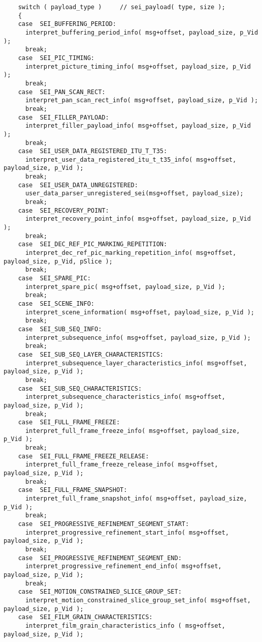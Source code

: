 \begin{lstlisting}
    switch ( payload_type )     // sei_payload( type, size );
    {
    case  SEI_BUFFERING_PERIOD:
      interpret_buffering_period_info( msg+offset, payload_size, p_Vid );
      break;
    case  SEI_PIC_TIMING:
      interpret_picture_timing_info( msg+offset, payload_size, p_Vid );
      break;
    case  SEI_PAN_SCAN_RECT:
      interpret_pan_scan_rect_info( msg+offset, payload_size, p_Vid );
      break;
    case  SEI_FILLER_PAYLOAD:
      interpret_filler_payload_info( msg+offset, payload_size, p_Vid );
      break;
    case  SEI_USER_DATA_REGISTERED_ITU_T_T35:
      interpret_user_data_registered_itu_t_t35_info( msg+offset, payload_size, p_Vid );
      break;
    case  SEI_USER_DATA_UNREGISTERED:
      user_data_parser_unregistered_sei(msg+offset, payload_size);
      break;
    case  SEI_RECOVERY_POINT:
      interpret_recovery_point_info( msg+offset, payload_size, p_Vid );
      break;
    case  SEI_DEC_REF_PIC_MARKING_REPETITION:
      interpret_dec_ref_pic_marking_repetition_info( msg+offset, payload_size, p_Vid, pSlice );
      break;
    case  SEI_SPARE_PIC:
      interpret_spare_pic( msg+offset, payload_size, p_Vid );
      break;
    case  SEI_SCENE_INFO:
      interpret_scene_information( msg+offset, payload_size, p_Vid );
      break;
    case  SEI_SUB_SEQ_INFO:
      interpret_subsequence_info( msg+offset, payload_size, p_Vid );
      break;
    case  SEI_SUB_SEQ_LAYER_CHARACTERISTICS:
      interpret_subsequence_layer_characteristics_info( msg+offset, payload_size, p_Vid );
      break;
    case  SEI_SUB_SEQ_CHARACTERISTICS:
      interpret_subsequence_characteristics_info( msg+offset, payload_size, p_Vid );
      break;
    case  SEI_FULL_FRAME_FREEZE:
      interpret_full_frame_freeze_info( msg+offset, payload_size, p_Vid );
      break;
    case  SEI_FULL_FRAME_FREEZE_RELEASE:
      interpret_full_frame_freeze_release_info( msg+offset, payload_size, p_Vid );
      break;
    case  SEI_FULL_FRAME_SNAPSHOT:
      interpret_full_frame_snapshot_info( msg+offset, payload_size, p_Vid );
      break;
    case  SEI_PROGRESSIVE_REFINEMENT_SEGMENT_START:
      interpret_progressive_refinement_start_info( msg+offset, payload_size, p_Vid );
      break;
    case  SEI_PROGRESSIVE_REFINEMENT_SEGMENT_END:
      interpret_progressive_refinement_end_info( msg+offset, payload_size, p_Vid );
      break;
    case  SEI_MOTION_CONSTRAINED_SLICE_GROUP_SET:
      interpret_motion_constrained_slice_group_set_info( msg+offset, payload_size, p_Vid );
    case  SEI_FILM_GRAIN_CHARACTERISTICS:
      interpret_film_grain_characteristics_info ( msg+offset, payload_size, p_Vid );

\end{lstlisting}
